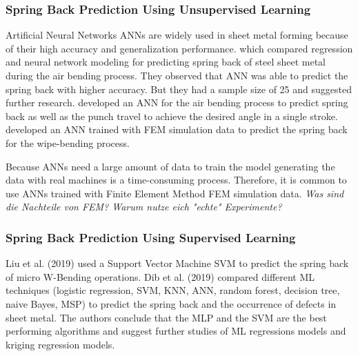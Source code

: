 \subsubsection*{Spring Back Prediction Using Unsupervised Learning}
Artificial Neural Networks \ac{ANN}s are widely used in sheet metal forming because of their high accuracy and generalization performance. \cite[p. 2]{cruz_applicationmachinelearning_2021} \cite[]{narayanasamy_comparisonregressionartificial_2012a} which compared regression and neural network modeling for predicting spring back of steel sheet metal during the air bending process.  
They observed that ANN was able to predict the spring back with higher accuracy. But they had a sample size of 25 and suggested further research. 
\cite[]{inamdar_developmentartificialneural_2000} developed an ANN for the air bending process to predict spring back as well as the punch travel to achieve the desired angle in a single stroke.
\cite[]{kazan_predictionspringbackwipebending_2009} developed an ANN trained with FEM simulation data to predict the spring back for the wipe-bending process.


Because \ac{ANN}s need a large amount of data to train the model generating the data with real machines is a time-consuming process.
Therefore, it is common to use \ac{ANN}s trained with Finite Element Method \ac{FEM} simulation data.
\textit{Was sind die Nachteile von FEM? Warum nutze eich "echte" Experimente?}

\subsubsection*{Spring Back Prediction Using Supervised Learning}
Liu et al. (2019) used a Support Vector Machine \ac{SVM} to predict the spring back of micro W-Bending operations. \cite{liu_springbackpredictionforming_2019} 
Dib et al. (2019) compared different \ac{ML} techniques (logistic regression, SVM, KNN, ANN, random forest, decision tree, naive Bayes, MSP) to predict the spring back and the occurrence of defects in sheet metal. \cite[p. 1]{dib_singleensembleclassifiers_2020}
The authors conclude that the MLP and the SVM are the best performing algorithms and suggest further studies of ML regressions models and kriging regression models. \cite[p. 13]{dib_singleensembleclassifiers_2020}

